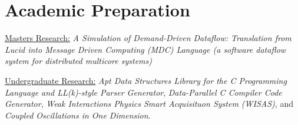 \section{Academic Preparation}



{\vspace{3pt}\underline{Masters Research:} \textit{A Simulation of Demand-Driven Dataflow: Translation from Lucid into Message Driven Computing (MDC) Language (a software dataflow system for distributed multicore systems)}}{\vspace{3pt}}

{\vspace{4pt}\underline{Undergraduate Research:} \textit{Apt Data Structures Library for the C Programming Language and LL(k)-style Parser Generator}, \textit{Data-Parallel C Compiler Code Generator}, \textit{Weak Interactions Physics Smart Acquisituon System (WISAS)}, and \textit{Coupled Oscillations in One Dimension}}{\vspace{3pt}}.

